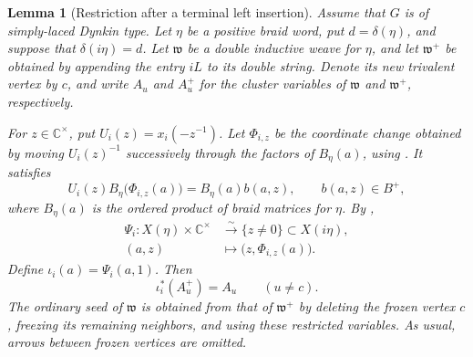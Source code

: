 \documentclass[12pt, reqno]{amsart}
\theoremstyle{plain}
\newtheorem{lemma}[theorem]{Lemma}
\theoremstyle{definition}
\numberwithin{equation}{section}
\begin{document}
\begin{lemma}[Restriction after a terminal left insertion]
\label{lem:terminal-left-restriction}
Assume that \(G\) is of simply-laced Dynkin type. Let \(\eta\) be a
positive braid word, put \(d=\delta(\eta)\), and suppose that
\(\delta(i\eta)=d\). Let \(\mathfrak w\) be a double inductive weave
for \(\eta\), and let \(\mathfrak w^+\) be obtained by appending the
entry \(iL\) to its double string. Denote its new trivalent vertex by
\(c\), and write \(A_u\) and \(A_u^+\) for the cluster variables of
\(\mathfrak w\) and \(\mathfrak w^+\), respectively.

For \(z\in\mathbb C^\times\), put \(U_i(z)=x_i(-z^{-1})\).
Let \(\Phi_{i,z}\) be the coordinate change obtained by moving
\(U_i(z)^{-1}\) successively through the factors of \(B_\eta(a)\),
using \cite[Corollary~3.9 and Lemma~4.2]{casals2025cluster}.
It satisfies
\begin{equation}\label{eq:terminal-left-coordinate-change}
U_i(z)B_\eta\bigl(\Phi_{i,z}(a)\bigr)
=B_\eta(a)b(a,z),\qquad b(a,z)\in B^+,
\end{equation}
where \(B_\eta(a)\) is the ordered product of braid matrices for
\(\eta\). By \cite[Lemmas~4.2 and~5.24\textup{(2)}]{casals2025cluster},
\[
\begin{aligned}
\Psi_i:X(\eta)\times\mathbb C^\times
&\xrightarrow{\sim}\{z\ne0\}\subset X(i\eta),\\
(a,z)&\longmapsto\bigl(z,\Phi_{i,z}(a)\bigr).
\end{aligned}
\]
Define \(\iota_i(a)=\Psi_i(a,1)\). Then
\begin{equation}\label{eq:terminal-left-variable-restriction}
\iota_i^*(A_u^+)=A_u\qquad(u\ne c).
\end{equation}
The ordinary seed of \(\mathfrak w\) is obtained from that of
\(\mathfrak w^+\) by deleting the frozen vertex \(c\), freezing its
remaining neighbors, and using these restricted variables.
As usual, arrows between frozen vertices are omitted.
\end{lemma}
\end{document}
